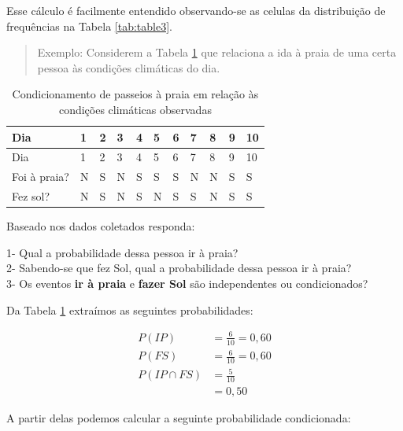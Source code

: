 \documentclass[
]{book}
\begin{document}
\hfill\break

Esse cálculo é facilmente entendido observando-se as celulas da distribuição de frequências na Tabela \ref{tab:table3}.

\hfill\break

\begin{quote}
Exemplo: Considerem a Tabela \ref{tab:table4} que relaciona a ida à praia de uma certa pessoa às condições climáticas do dia.
\end{quote}

\hfill\break

\begin{longtable}[]{@{}lllllllllll@{}}
\caption{\label{tab:table4} Condicionamento de passeios à praia em relação às condições climáticas observadas}\tabularnewline
\toprule()
Dia & 1 & 2 & 3 & 4 & 5 & 6 & 7 & 8 & 9 & 10 \\
\midrule()
\endfirsthead
\toprule()
Dia & 1 & 2 & 3 & 4 & 5 & 6 & 7 & 8 & 9 & 10 \\
\midrule()
\endhead
Foi à praia? & N & S & N & S & S & S & N & N & S & S \\
Fez sol? & N & S & N & S & N & S & S & N & S & S \\
\bottomrule()
\end{longtable}

\hfill\break

Baseado nos dados coletados responda:

\hfill\break

1- Qual a probabilidade dessa pessoa ir à praia?\\
2- Sabendo-se que fez Sol, qual a probabilidade dessa pessoa ir à praia?\\
3- Os eventos \textbf{ir à praia} e \textbf{fazer Sol} são independentes ou condicionados?

\hfill\break

Da Tabela \ref{tab:table4} extraímos as seguintes probabilidades:

\hfill\break

\begin{align*}
P(IP) & = \frac{6}{10}= 0,60 \\
P(FS) & = \frac{6}{10}= 0,60 \\
P(IP \cap FS) & = \frac{5}{10} \\
    & = 0,50 
\end{align*}

\hfill\break

A partir delas podemos calcular a seguinte probabilidade condicionada:
\end{document}
